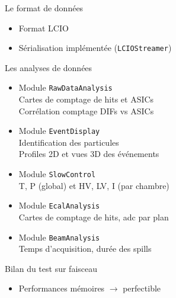 \documentclass[8pt]{beamer}
\begin{document}
  \begin{frame}
  \frametitle{\secname}
  \framesubtitle{\subsecname}
    \begin{block}{Le format de données}
      \begin{itemize}
        \item Format LCIO
        \item Sérialisation implémentée (\texttt{LCIOStreamer})
      \end{itemize}
    \end{block}
    \pause
    \begin{block}{Les analyses de données}
      \begin{minipage}{0.49\linewidth}
        \begin{itemize}
          \item Module \texttt{RawDataAnalysis} \\
          Cartes de comptage de hits et ASICs \\
          Corrélation comptage DIFs vs ASICs
          \item Module \texttt{EventDisplay} \\
          Identification des particules \\
          Profiles 2D et vues 3D des événements
        \end{itemize}
      \end{minipage} \hfill
      \begin{minipage}{0.49\linewidth}
        \begin{itemize}
          \item Module \texttt{SlowControl} \\
          T, P (global) et HV, LV, I (par chambre)
          \item Module \texttt{EcalAnalysis} \\
          Cartes de comptage de hits, adc par plan
          \item Module \texttt{BeamAnalysis} \\
          Temps d'acquisition, durée des spills
        \end{itemize}
      \end{minipage}
    \end{block}
    \pause
    \begin{block}{Bilan du test sur faisceau}
      \begin{minipage}{0.49\linewidth}
        \begin{itemize}
          \item Performances mémoires $\rightarrow$ perfectible

\end{itemize}
\end{minipage}
\end{block}
\end{frame}
\end{document}
